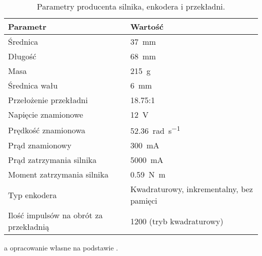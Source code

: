 \begin{table}[h]
    \centering
    \begin{threeparttable}
        \caption{Parametry producenta silnika, enkodera i przekładni.}
        \label{tab:parametry_silnika}
        
        \begin{tabularx}{0.9\textwidth}{l | l}
            \toprule
            Parametr & Wartość \\
            \midrule
            Średnica & \SI{37}{\milli\meter} \\
            Długość & \SI{68}{\milli\meter} \\
            Masa & \SI{215}{g} \\
            Średnica wału & \SI{6}{\milli\meter} \\
            \midrule
            Przełożenie przekładni & \num{18,75}:\num{1} \\
            \midrule
            Napięcie znamionowe & \SI{12}{\volt} \\
            Prędkość znamionowa & \SI{52,36}{\radian\per\second} \\
            Prąd znamionowy & \SI{300}{\milli\ampere} \\
            Prąd zatrzymania silnika & \SI{5000}{\milli\ampere} \\
            Moment zatrzymania silnika & \SI{0,59}{\newton\meter} \\
            \midrule
            Typ enkodera & Kwadraturowy, inkrementalny, bez pamięci \\
            Ilość impulsów na obrót za przekładnią & \num{1200} (tryb kwadraturowy) \\
            \bottomrule
        \end{tabularx}
        
        \begin{tablenotes}
            \footnotesize
            \item[a] opracowanie własne na podstawie \cite{SILNIK_MANUAL}.
        \end{tablenotes}
    \end{threeparttable}
\end{table}

